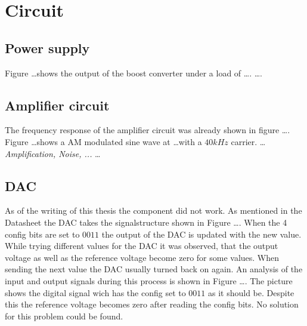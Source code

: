 \section{Circuit}

\subsection{Power supply}

Figure \dots shows the output of the boost converter under a load of \dots. \dots.

\subsection{Amplifier circuit}

The frequency response of the amplifier circuit was already shown in figure \dots. Figure \dots shows a AM modulated sine wave at \dots with a $40kHz$ carrier. \dots \textit{Amplification, Noise, ...} \dots

\subsection{DAC}\label{sec:meas:circuit:dac}

As of the writing of this thesis the component did not work. As mentioned in the Datasheet the DAC takes the signalstructure shown in Figure \dots. When the 4 config bits are set to $0011$ the output of the DAC is updated with the new value.
While trying different values for the DAC it was observed, that the output voltage as well as the reference voltage become zero for some values. When sending the next value the DAC usually turned back on again. An analysis of the input and output signals during this process is shown in Figure \dots.\p
The picture shows the digital signal wich has the config set to $0011$ as it should be. Despite this the reference voltage becomes zero after reading the config bits. No solution for this problem could be found.